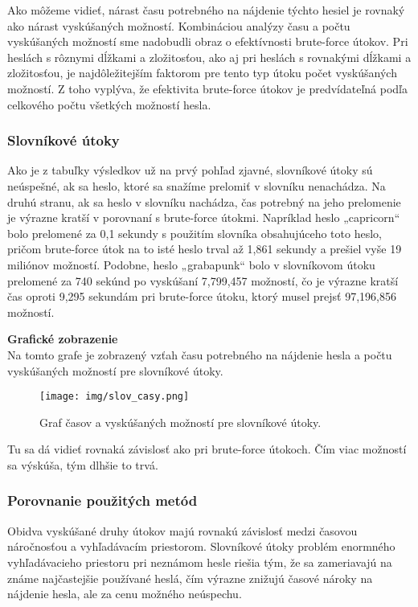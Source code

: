 \documentclass[12pt, twoside]{book}
\newcommand{\subsubsubsection}[1]{%
  \textbf{#1} \\ 
}
\begin{document}
Ako môžeme vidieť, nárast času potrebného na nájdenie týchto hesiel je rovnaký ako nárast vyskúšaných možností. Kombináciou analýzy času a počtu vyskúšaných možností sme nadobudli obraz o efektívnosti brute-force útokov. Pri heslách s rôznymi dĺžkami a zložitosťou, ako aj pri heslách s rovnakými dĺžkami a zložitosťou, je najdôležitejším faktorom pre tento typ útoku počet vyskúšaných možností. Z toho vyplýva, že efektivita brute-force útokov je predvídateľná podľa celkového počtu všetkých možností hesla.




\subsubsection{Slovníkové útoky}
Ako je z tabuľky výsledkov už na prvý pohľad zjavné, slovníkové útoky sú neúspešné, ak sa heslo, ktoré sa snažíme prelomiť v slovníku nenachádza. Na druhú stranu, ak sa heslo v slovníku nachádza, čas potrebný na jeho prelomenie je výrazne kratší v porovnaní s brute-force útokmi. Napríklad heslo „capricorn“ bolo prelomené za 0,1 sekundy s použitím slovníka obsahujúceho toto heslo, pričom brute-force útok na to isté heslo trval až 1,861 sekundy a prešiel vyše 19 miliónov možností. Podobne, heslo „grabapunk“ bolo v slovníkovom útoku prelomené za 740 sekúnd po vyskúšaní 7,799,457 možností, čo je výrazne kratší čas oproti 9,295 sekundám pri brute-force útoku, ktorý musel prejsť 97,196,856 možností. 


\subsubsubsection{Grafické zobrazenie}
Na tomto grafe je zobrazený vzťah času potrebného na nájdenie hesla a počtu vyskúšaných možností pre slovníkové útoky. 

\begin{figure}[H] 
    \centering
    \texttt{[image: img/slov\_casy.png]}
    \caption{Graf časov a vyskúšaných možností pre slovníkové útoky.}
    \label{fig:slov_casy}
\end{figure}

Tu sa dá vidieť rovnaká závislosť ako pri brute-force útokoch. Čím viac možností sa výskúša, tým dlhšie to trvá. 

\subsubsection{Porovnanie použitých metód}
Obidva vyskúšané druhy útokov majú rovnakú závislosť medzi časovou náročnosťou a vyhľadávacím priestorom. Slovníkové útoky problém enormného vyhľadávacieho priestoru pri neznámom hesle riešia tým, že sa zameriavajú na známe najčastejšie používané heslá, čím výrazne znižujú časové nároky na nájdenie hesla, ale za cenu možného neúspechu.
\end{document}
